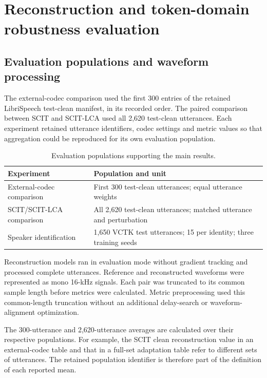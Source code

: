 \section{Reconstruction and token-domain robustness evaluation}
\label{sec:sv2-evaluation}

\subsection{Evaluation populations and waveform processing}
The external-codec comparison used the first 300 entries of the retained LibriSpeech test-clean manifest, in its recorded order. The paired comparison between SCIT and SCIT-LCA used all 2,620 test-clean utterances. Each experiment retained utterance identifiers, codec settings and metric values so that aggregation could be reproduced for its own evaluation population.

\begin{table}[t]
\centering
\caption{Evaluation populations supporting the main results.}
\label{tab:sv2-populations}
\small
\begin{tabularx}{\columnwidth}{@{}lY@{}}
\toprule
Experiment & Population and unit\\
\midrule
External-codec comparison & First 300 test-clean utterances; equal utterance weights\\
SCIT/SCIT-LCA comparison & All 2,620 test-clean utterances; matched utterance and perturbation\\
Speaker identification & 1,650 VCTK test utterances; 15 per identity; three training seeds\\
\bottomrule
\end{tabularx}
\end{table}

Reconstruction models ran in evaluation mode without gradient tracking and processed complete utterances. Reference and reconstructed waveforms were represented as mono 16-kHz signals. Each pair was truncated to its common sample length before metrics were calculated. Metric preprocessing used this common-length truncation without an additional delay-search or waveform-alignment optimization.

The 300-utterance and 2,620-utterance averages are calculated over their respective populations. For example, the SCIT clean reconstruction value in an external-codec table and that in a full-set adaptation table refer to different sets of utterances. The retained population identifier is therefore part of the definition of each reported mean.

